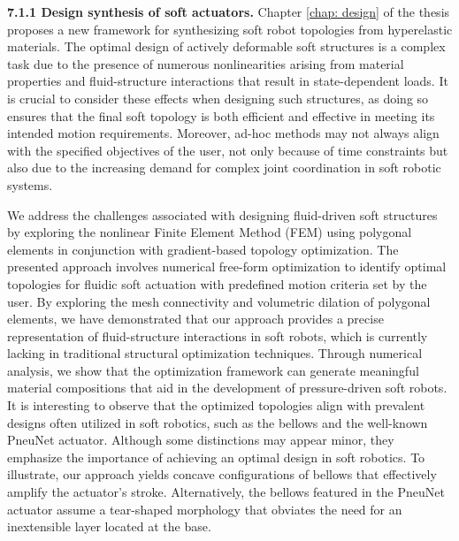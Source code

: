 

\textbf{7.1.1 Design synthesis of soft actuators.} Chapter \ref{chap: design} of the thesis proposes a new framework for synthesizing soft robot topologies from hyperelastic materials. The optimal design of actively deformable soft structures is a complex task due to the presence of numerous nonlinearities arising from material properties and fluid-structure interactions that result in state-dependent loads. It is crucial to consider these effects when designing such structures, as doing so ensures that the final soft topology is both efficient and effective in meeting its intended motion requirements. Moreover, ad-hoc methods may not always align with the specified objectives of the user, not only because of time constraints but also due to the increasing demand for complex joint coordination in soft robotic systems.

We address the challenges associated with designing fluid-driven soft structures by exploring the nonlinear Finite Element Method (FEM) using polygonal elements in conjunction with gradient-based topology optimization. The presented approach involves numerical free-form optimization to identify optimal topologies for fluidic soft actuation with predefined motion criteria set by the user. By exploring the mesh connectivity and volumetric dilation of polygonal elements, we have demonstrated that our approach provides a precise representation of fluid-structure interactions in soft robots, which is currently lacking in traditional structural optimization techniques. Through numerical analysis, we show that the optimization framework can generate meaningful material compositions that aid in the development of pressure-driven soft robots. It is interesting to observe that the optimized topologies align with prevalent designs often utilized in soft robotics, such as the bellows and the well-known PneuNet actuator. Although some distinctions may appear minor, they emphasize the importance of achieving an optimal design in soft robotics. To illustrate, our approach yields concave configurations of bellows that effectively amplify the actuator's stroke. Alternatively, the bellows featured in the PneuNet actuator assume a tear-shaped morphology that obviates the need for an inextensible layer located at the base. \\[0.05em]

